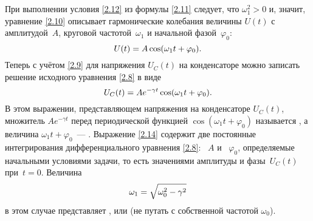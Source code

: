 При выполнении условия
\eqref{2.12} из формулы \eqref{2.11} следует, что $\omega_1^2>0$ и, значит,
уравнение \eqref{2.10} описывает гармонические колебания величины $U(t)$ с
амплитудой~$A$, круговой частотой~$\omega_1$ и начальной фазой~$\varphi_0$:
\begin{equation*}\eqmark{2.13}
U(t)=A\cos(\omega_1t+\varphi_0).
\end{equation*}
Теперь с учётом \eqref{2.9} для напряжения $U_C(t)$ на конденсаторе
можно записать решение исходного уравнения \eqref{2.8} в виде
\begin{equation}\eqmark{2.14}
U_C(t)=Ae^{-\gamma t}\cos(\omega_1t+\varphi_0).
\end{equation}
В этом выражении, представляющем  напряжения на
конденсаторе $U_C(t)$, множитель $A e^{-\gamma t}$ перед периодической функцией
$\cos(\omega_1 t+\varphi_0)$ называется , а величина $\omega_1t+\varphi_0$~--- . Выражение \eqref{2.14} содержит две постоянные интегрирования
дифференциального уравнения \eqref{2.8}: ~$A$ и
~$\varphi_0$, определяемые начальными условиями
задачи, то есть значениями амплитуды и фазы~$U_C(t)$ при~$t=0$. Величина
\begin{equation}\eqmark{2.15}
\omega_1=\sqrt{\omega_0^2-\gamma^2}
\end{equation}
в этом случае представляет , или
 (не путать с собственной частотой
$\omega_0$).

